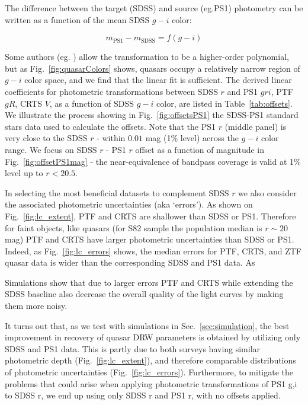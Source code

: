 \documentclass[twocolumn]{aastex62}
\begin{document}
The difference  between the target (SDSS) and source (eg.PS1) photometry can be written as a function of the mean SDSS $g-i$ color: 

\begin{equation}
m_{\mathrm{PS1}} - m_{\mathrm{SDSS}} = f(g-i)
\end{equation}

Some authors (eg. \citealt{li2018}) allow the transformation to be a higher-order polynomial, but as Fig.~\ref{fig:quasarColors} shows, quasars occupy a relatively narrow region of $g-i$ color space, and we find that the linear fit is sufficient. The derived linear coefficients for photometric transformations between SDSS $r$ and PS1 $gri$, PTF $gR$, CRTS $V$,  as a function of SDSS $g-i$ color, are listed in Table~\ref{tab:offsets}. We illustrate the process showing in Fig.~\ref{fig:offsetsPS1} the SDSS-PS1 standard stars data used to calculate the offsets. Note that the PS1 $r$ (middle panel) is very close to the SDSS $r$ - within  $0.01$ mag (1\% level) across the $g-i$ color range. We focus on SDSS $r$ - PS1 $r$ offset as a function of magnitude in Fig.~\ref{fig:offsetPS1mag} - the near-equivalence of bandpass coverage is valid at 1\% level up to $r < 20.5$. %

In selecting the most beneficial datasets to complement SDSS $r$ we also consider the associated photometric uncertainties (aka `errors'). As shown on Fig.~\ref{fig:lc_extent},  PTF and CRTS are shallower than SDSS or PS1. Therefore for faint objects, like quasars (for S82 sample the population median is $r \sim 20$ mag) PTF and CRTS have larger photometric uncertainties than SDSS or PS1. Indeed, as Fig.~\ref{fig:lc_errors} shows, the median errors for PTF, CRTS, and ZTF quasar data is wider than the corresponding SDSS and PS1 data. As 



Simulations show that due to larger errors PTF and CRTS while extending the SDSS baseline also decrease the overall quality of the light curves by making them more noisy. 

It turns out that, as we test with simulations in Sec.~\ref{sec:simulation}, the best improvement in recovery of quasar DRW parameters is obtained by utilizing only SDSS and PS1 data. This is partly due to both surveys having similar photometric depth (Fig.~\ref{fig:lc_extent}), and therefore comparable distributions of photometric uncertainties (Fig.~\ref{fig:lc_errors}). Furthermore, to mitigate the problems that could arise when applying photometric transformations of PS1 g,i to SDSS r, we end up using only SDSS r and PS1 r, with no offsets applied. 
\end{document}
